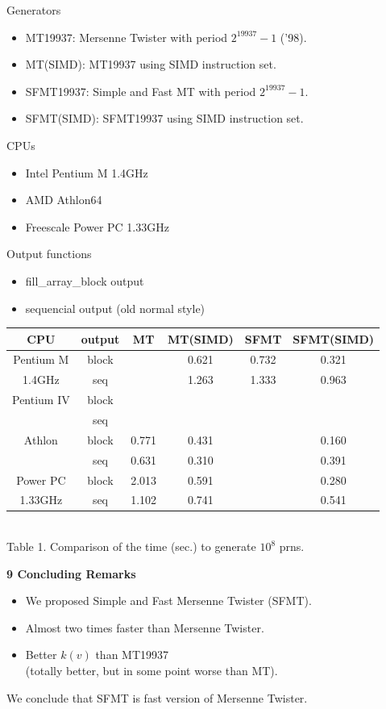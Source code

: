 \documentclass[a4j,12pt,landscape]{jarticle}
\begin{document}
\begin{description}
  \item Generators
    \begin{itemize}
    \item MT19937: Mersenne Twister with period $2^{19937}-1$ ('98).
    \item MT(SIMD): MT19937 using SIMD instruction set.
    \item SFMT19937: Simple and Fast MT with period $2^{19937}-1$.
    \item SFMT(SIMD): SFMT19937 using SIMD instruction set.
    \end{itemize}
  \item CPUs
    \begin{itemize}
    \item Intel Pentium M 1.4GHz
    \item AMD Athlon64 
    \item Freescale Power PC 1.33GHz
    \end{itemize}
  \item Output functions
    \begin{itemize}
    \item fill\_array\_block output
    \item sequencial output (old normal style)
    \end{itemize}
  \end{description}

\newpage
\begin{center}
\begin{tabular}{|c|c||c|c|c|c|}
\hline
CPU & output & MT & MT{\Large(SIMD)} & SFMT & SFMT{\Large (SIMD)} \\
\hline \hline
Pentium M  & block & & 0.621 & 0.732 & 0.321\\ \cline{2-6}
1.4GHz & seq & & 1.263 & 1.333 & 0.963\\ \hline
Pentium IV & block & & & & \\ \cline{2-6}
& seq & & & &\\ \hline
Athlon & block &0.771 & 0.431 & & 0.160 \\ \cline{2-6}
& seq & 0.631 & 0.310 & & 0.391 \\ \hline
Power PC  & block & 2.013 & 0.591 & & 0.280\\ \cline{2-6}
1.33GHz & seq & 1.102 & 0.741 & & 0.541 \\ \hline
\end{tabular}
\\
\vskip 5mm
Table 1. Comparison of the time (sec.) to generate $10^8$ prns.
\end{center}

\newpage
\noindent
{\bf 9 Concluding Remarks}
\begin{itemize}
\item We proposed Simple and Fast Mersenne Twister (SFMT). 
\item Almost two times faster than Mersenne Twister.
\item Better $k(v)$ than MT19937 \\
(totally better, but in some point worse than MT).
\end{itemize}
We conclude that SFMT is fast version of Mersenne Twister.
\end{document}
